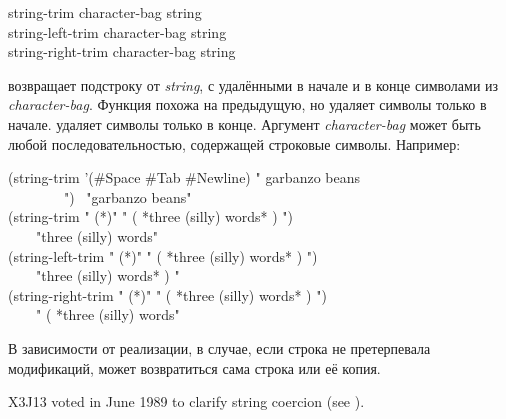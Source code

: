 \begin{defun}[Функция]
string-trim character-bag string \\
string-left-trim character-bag string \\
string-right-trim character-bag string

 возвращает подстроку от \emph{string}, с удалёнными в начале и
в конце символами из \emph{character-bag}.
Функция  похожа на предыдущую, но удаляет символы только в
начале.
 удаляет символы только в
конце.
Аргумент \emph{character-bag} может быть любой последовательностью, содержащей
строковые символы.
Например:
\begin{lisp}
(string-trim '(\#{\Xbackslash}Space \#{\Xbackslash}Tab \#{\Xbackslash}Newline) " garbanzo beans \\
~~~~~~~~") \EV\ "garbanzo beans" \\
(string-trim " (*)" " ( *three (silly) words* ) ") \\
~~~\EV\ "three (silly) words" \\
(string-left-trim " (*)" " ( *three (silly) words* ) ") \\
~~~\EV\ "three (silly) words* ) " \\
(string-right-trim " (*)" " ( *three (silly) words* ) ") \\
~~~\EV\ " ( *three (silly) words"
\end{lisp}
В зависимости от реализации, в случае, если строка не претерпевала модификаций,
может возвратиться сама строка или её копия.

\begin{newer}
X3J13 voted in June 1989 
to clarify string coercion (see ).
\end{newer}
\end{defun}

